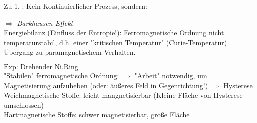 Zu 1. : Kein Kontinuierlicher Prozess, sondern:

\bild
$ \Rightarrow $ \emph{Barkhausen-Effekt} \\ \break
Energiebilanz (Einfluss der Entropie!): Ferromagnetische Ordnung nicht temperaturstabil, d.h. einer "kritischen Temperatur" (Curie-Temperatur) Übergang zu paramagnetischem Verhalten.\\ \break

$ \boxed{\text{Exp: Drehender Ni.Ring}} $ \\
"Stabilen" ferromagnetische Ordnung:
$ \Rightarrow $ "Arbeit" notwendig, um Magnetisierung aufzuheben (oder: äußeres Feld in Gegenrichtung!)
\bild
$ \Rightarrow $ Hysterese \\
Weichmagnetische Stoffe: leicht mangnetisierbar (Kleine Fläche von Hysterese umschlossen)\\
Hartmagnetische Stoffe: schwer magnetisierbar, große Fläche\\
